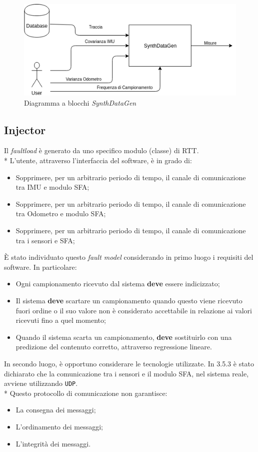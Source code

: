 \begin{figure}[h]
	\centering
	\includegraphics[width=0.7\linewidth]{img/SynthDataGen}
	\caption{Diagramma a blocchi \emph{SynthDataGen}}
	\label{fig:synthdatagen}
\end{figure}
\subsection{Injector}
Il \emph{faultload} \`e generato da uno specifico modulo (classe) di RTT.\\*
L'utente, attraverso l'interfaccia del software, \`e in grado di:
\begin{itemize}
	\item Sopprimere, per un arbitrario periodo di tempo, il canale di comunicazione tra IMU e modulo SFA;
	\item Sopprimere, per un arbitrario periodo di tempo, il canale di comunicazione tra Odometro e modulo SFA;
	\item Sopprimere, per un arbitrario periodo di tempo, il canale di comunicazione tra i sensori e SFA;
\end{itemize}
\`E stato individuato questo \emph{fault model} considerando in primo luogo i requisiti del software. In particolare:
\begin{itemize}
		\item Ogni campionamento ricevuto dal sistema \textbf{deve} essere indicizzato;
		\item Il sistema \textbf{deve} scartare un campionamento quando questo viene ricevuto fuori ordine o il suo valore non \`e considerato accettabile in relazione ai valori ricevuti fino a quel momento;
		\item Quando il sistema scarta un campionamento, \textbf{deve} sostituirlo con una predizione del contenuto corretto, attraverso regressione lineare.
\end{itemize}
In secondo luogo, \`e opportuno considerare le tecnologie utilizzate. In 3.5.3 \`e stato dichiarato che la comunicazione tra i sensori e il modulo SFA, nel sistema reale, avviene utilizzando \texttt{UDP}.\\*
Questo protocollo di comunicazione non garantisce:
	\begin{itemize}
		\item La consegna dei messaggi;
		\item L'ordinamento dei messaggi;
		\item L'integrit\`a dei messaggi.
	\end{itemize}
